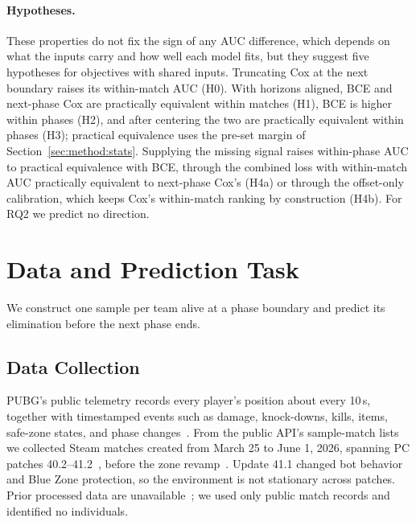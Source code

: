 \documentclass[sigconf,anonymous]{acmart}
\begin{document}
\paragraph{Hypotheses.}
These properties do not fix the sign of any AUC difference, which depends on what the inputs carry and how well each model fits, but they suggest five hypotheses for objectives with shared inputs. Truncating Cox at the next boundary raises its within-match AUC (H0). With horizons aligned, BCE and next-phase Cox are practically equivalent within matches (H1), BCE is higher within phases (H2), and after centering the two are practically equivalent within phases (H3); practical equivalence uses the pre-set margin of Section~\ref{sec:method:stats}. Supplying the missing signal raises within-phase AUC to practical equivalence with BCE, through the combined loss with within-match AUC practically equivalent to next-phase Cox's (H4a) or through the offset-only calibration, which keeps Cox's within-match ranking by construction (H4b). For RQ2 we predict no direction.

\section{Data and Prediction Task}
\label{sec:method}
We construct one sample per team alive at a phase boundary and predict its elimination before the next phase ends.


\subsection{Data Collection}
\label{sec:method:data}
PUBG's public telemetry records every player's position about every 10\,s, together with timestamped events such as damage, knock-downs, kills, items, safe-zone states, and phase changes~\cite{PUBGAPI}. From the public API's sample-match lists we collected Steam matches created from March 25 to June 1, 2026, spanning PC patches 40.2--41.2~\cite{PUBGPatchNotes2026}, before the zone revamp~\cite{PUBGBlueZone2026}. Update 41.1 changed bot behavior and Blue Zone protection, so the environment is not stationary across patches. Prior processed data are unavailable~\cite{Sagong25a,KRAFTON}; we used only public match records and identified no individuals.
\end{document}
